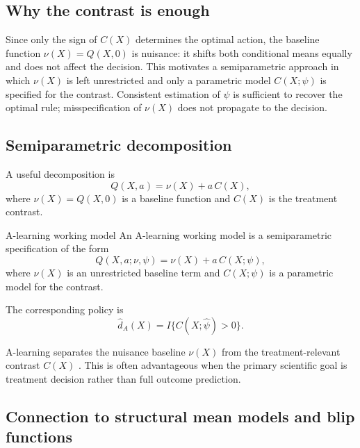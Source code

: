 \documentclass[master.tex]{subfiles}
\begin{document}
\subsection{Why the contrast is enough}

Since only the sign of \(C(X)\) determines the optimal action, the
baseline function \(\nu(X)=Q(X,0)\) is nuisance: it shifts both conditional
means equally and does not affect the decision. This motivates a semiparametric
approach in which \(\nu(X)\) is left unrestricted and only a parametric model
\(C(X;\psi)\) is specified for the contrast. Consistent estimation of
\(\psi\) is sufficient to recover the optimal rule; misspecification of
\(\nu(X)\) does not propagate to the decision.

\subsection{Semiparametric decomposition}

A useful decomposition is
\[
Q(X,a)=\nu(X)+a\,C(X),
\]
where \(\nu(X)=Q(X,0)\) is a baseline function and \(C(X)\) is the treatment contrast.

\begin{defn}{A-learning working model}
\label{w14:defn:amodel}
An A-learning working model is a semiparametric specification of the form
\[
Q(X,a;\nu,\psi)=\nu(X)+a\,C(X;\psi),
\]
where \(\nu(X)\) is an unrestricted baseline term and \(C(X;\psi)\) is a parametric model for the contrast.
\end{defn}

The corresponding policy is
\[
\hat d_A(X)=I\{C(X;\hat\psi)>0\}.
\]

\begin{remark}
A-learning separates the nuisance baseline \(\nu(X)\) from the treatment-relevant contrast \(C(X)\) \citep{murphy2003optimal}. This is often advantageous when the primary scientific goal is treatment decision rather than full outcome prediction.
\end{remark}

\subsection{Connection to structural mean models and blip functions}
\end{document}

